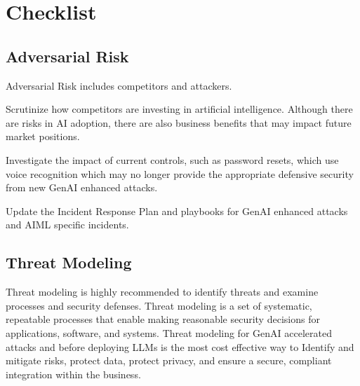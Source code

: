 

\headerimage
\chapter{Checklist}

\section{Adversarial Risk}
Adversarial Risk includes competitors and attackers.

\begin{minipage}{\linewidth}
\begin{checklist}
  \item Scrutinize how competitors are investing in artificial intelligence.
  Although there are risks in AI adoption, there are also business benefits
  that may impact future market positions.
  \item Investigate the impact of current controls, such as password resets,
  which use voice recognition which may no longer provide the appropriate
  defensive security from new GenAI enhanced attacks.
  \item Update the Incident Response Plan and playbooks for GenAI enhanced
  attacks and AIML specific incidents.
\end{checklist}
\end{minipage}

\section{Threat Modeling}
Threat modeling is highly recommended to identify threats and examine processes
and security defenses. Threat modeling is a set of systematic, repeatable
processes that enable making reasonable security decisions for applications,
software, and systems. Threat modeling for GenAI accelerated attacks and before
deploying LLMs is the most cost effective way to Identify and mitigate risks,
protect data, protect privacy, and ensure a secure, compliant integration
within the business.

